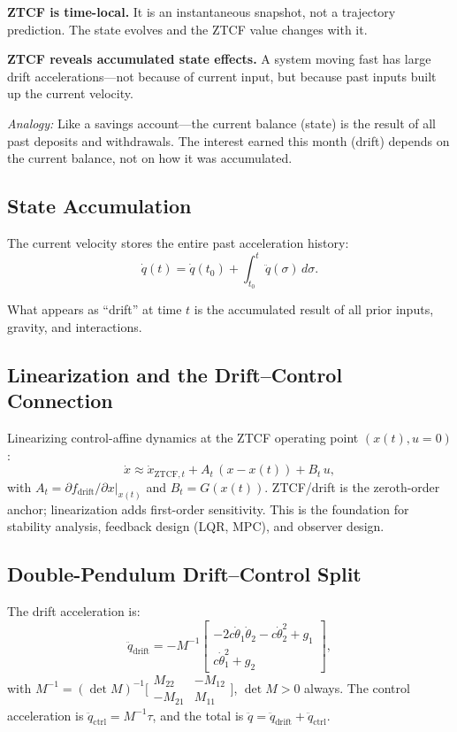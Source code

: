 \documentclass[11pt]{article}
\begin{document}
\textbf{ZTCF is time-local.} It is an instantaneous snapshot, not a trajectory prediction. The state evolves and the ZTCF value changes with it.

\textbf{ZTCF reveals accumulated state effects.} A system moving fast has large drift accelerations---not because of current input, but because past inputs built up the current velocity.

\textit{Analogy:} Like a savings account---the current balance (state) is the result of all past deposits and withdrawals. The interest earned this month (drift) depends on the current balance, not on how it was accumulated.

\subsection{State Accumulation}

The current velocity stores the entire past acceleration history:
\begin{equation}\label{eq:state-accumulation}
\dot{q}(t) = \dot{q}(t_0) + \int_{t_0}^{t} \ddot{q}(\sigma)\,d\sigma.
\end{equation}

What appears as ``drift'' at time $t$ is the accumulated result of all prior inputs, gravity, and interactions.

\subsection{Linearization and the Drift--Control Connection}\label{sec:linearization}

Linearizing control-affine dynamics at the ZTCF operating point $(x(t), u = 0)$:
\begin{equation}\label{eq:linearized}
\dot{x} \approx \dot{x}_{\mathrm{ZTCF},t} + A_t\,(x - x(t)) + B_t\,u,
\end{equation}
with $A_t = \partial f_{\mathrm{drift}}/\partial x|_{x(t)}$ and $B_t = G(x(t))$. ZTCF/drift is the zeroth-order anchor; linearization adds first-order sensitivity. This is the foundation for stability analysis, feedback design (LQR, MPC), and observer design.

\subsection{Double-Pendulum Drift--Control Split}

The drift acceleration is:
\begin{equation}
\ddot{q}_{\mathrm{drift}} = -M^{-1}\begin{bmatrix}
-2c\dot\theta_1\dot\theta_2 - c\dot\theta_2^2 + g_1 \\
c\dot\theta_1^2 + g_2
\end{bmatrix},
\end{equation}
with $M^{-1} = (\det M)^{-1}\bigl[\begin{smallmatrix}M_{22}&-M_{12}\\-M_{21}&M_{11}\end{smallmatrix}\bigr]$, $\det M > 0$ always. The control acceleration is $\ddot{q}_{\mathrm{ctrl}} = M^{-1}\tau$, and the total is $\ddot{q} = \ddot{q}_{\mathrm{drift}} + \ddot{q}_{\mathrm{ctrl}}$.
\end{document}
